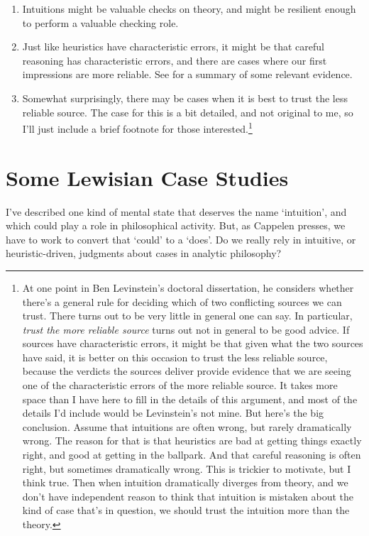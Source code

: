 \begin{enumerate}
\item Intuitions might be valuable checks on theory, and might be resilient enough to perform a valuable checking role.
\item Just like heuristics have characteristic errors, it might be that careful reasoning has characteristic errors, and there are cases where our first impressions are more reliable. See \citet{GladwellBlink} for a summary of some relevant evidence.
\item Somewhat surprisingly, there may be cases when it is best to trust the less reliable source. The case for this is a bit detailed, and not original to me, so I'll just include a brief footnote for those interested.\footnote{\label{footnote:Ben}At one point in Ben Levinstein's doctoral dissertation, he considers whether there's a general rule for deciding which of two conflicting sources we can trust. There turns out to be very little in general one can say. In particular, \textit{trust the more reliable source} turns out not in general to be good advice. If sources have characteristic errors, it might be that given what the two sources have said, it is better on this occasion to trust the less reliable source, because the verdicts the sources deliver provide evidence that we are seeing one of the characteristic errors of the more reliable source. It takes more space than I have here to fill in the details of this argument, and most of the details I'd include would be Levinstein's not mine. But here's the big conclusion. Assume that intuitions are often wrong, but rarely dramatically wrong. The reason for that is that heuristics are bad at getting things exactly right, and good at getting in the ballpark. And that careful reasoning is often right, but sometimes dramatically wrong. This is trickier to motivate, but I think true. Then when intuition dramatically diverges from theory, and we don't have independent reason to think that intuition is mistaken about the kind of case that's in question, we should trust the intuition more than the theory.}
\end{enumerate}





\section{Some Lewisian Case Studies}
\label{sec:Lewis}
I've described one kind of mental state that deserves the name `intuition', and which could play a role in philosophical activity. But, as Cappelen presses, we have to work to convert that `could' to a `does'. Do we really rely in intuitive, or heuristic-driven, judgments about cases in analytic philosophy?

